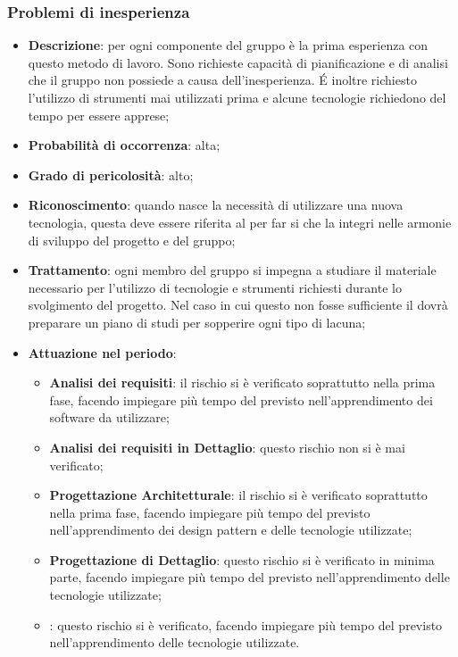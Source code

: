 		\subsubsection{Problemi di inesperienza}
		\begin{itemize}
			\item \textbf{Descrizione}: per ogni componente del gruppo è la prima esperienza con questo metodo di lavoro. Sono richieste capacità di pianificazione e di analisi che il gruppo non possiede a causa dell'inesperienza. \'E inoltre richiesto l'utilizzo di strumenti mai utilizzati prima e alcune tecnologie richiedono del tempo per essere apprese;
			\item \textbf{Probabilità di occorrenza}: alta;
			\item \textbf{Grado di pericolosità}: alto;
			\item \textbf{Riconoscimento}: quando nasce la necessità di utilizzare una nuova tecnologia, questa deve essere riferita al \textit{\Res} per far si che la integri nelle armonie di sviluppo del progetto e del gruppo; 
			\item \textbf{Trattamento}: ogni  membro del gruppo si impegna a studiare il materiale necessario per l'utilizzo di tecnologie e strumenti richiesti durante lo svolgimento del progetto. Nel caso in cui questo non fosse sufficiente il \textit{\Res} dovrà preparare un piano di studi per sopperire ogni tipo di lacuna;	
			\item \textbf{Attuazione nel periodo}:
			\begin{itemize}
				\item \textbf{Analisi dei requisiti}: il rischio si è verificato soprattutto nella prima fase, facendo impiegare più tempo del previsto nell'apprendimento dei software da utilizzare;
				\item \textbf{Analisi dei requisiti in Dettaglio}: questo rischio non si è mai verificato;
				\item \textbf{Progettazione Architetturale}: il rischio si è verificato soprattutto nella prima fase, facendo impiegare più tempo del previsto nell'apprendimento dei design pattern e delle tecnologie utilizzate; 
				\item \textbf{Progettazione di Dettaglio}: questo rischio si è verificato in minima parte, facendo impiegare più tempo del previsto nell'apprendimento delle tecnologie utilizzate;
				\item \textbf{\CO}: questo rischio si è verificato, facendo impiegare più tempo del previsto nell'apprendimento delle tecnologie utilizzate.
			\end{itemize}
		\end{itemize}
	
